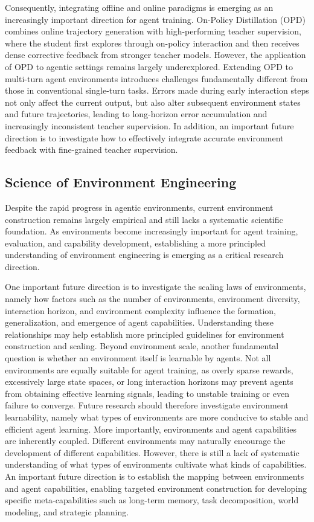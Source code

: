 \documentclass{llmxive}
\begin{document}
Consequently, integrating offline and online paradigms is emerging as an increasingly important direction for agent training.
On-Policy Distillation (OPD) \cite{OPD} combines online trajectory generation with high-performing teacher supervision, where the student first explores through on-policy interaction and then receives dense corrective feedback from stronger teacher models.
However, the application of OPD to agentic settings remains largely underexplored.
Extending OPD to multi-turn agent environments introduces challenges fundamentally different from those in conventional single-turn tasks.
Errors made during early interaction steps not only affect the current output, but also alter subsequent environment states and future trajectories, leading to long-horizon error accumulation and increasingly inconsistent teacher supervision.
In addition, an important future direction is to investigate how to effectively integrate accurate environment feedback with fine-grained teacher supervision.


\subsection{Science of Environment Engineering}

Despite the rapid progress in agentic environments, current environment construction remains largely empirical and still lacks a systematic scientific foundation.
As environments become increasingly important for agent training, evaluation, and capability development, establishing a more principled understanding of environment engineering is emerging as a critical research direction.

One important future direction is to investigate the scaling laws of environments, namely how factors such as the number of environments, environment diversity, interaction horizon, and environment complexity influence the formation, generalization, and emergence of agent capabilities.
Understanding these relationships may help establish more principled guidelines for environment construction and scaling.
Beyond environment scale, another fundamental question is whether an environment itself is learnable by agents.
Not all environments are equally suitable for agent training, as overly sparse rewards, excessively large state spaces, or long interaction horizons may prevent agents from obtaining effective learning signals, leading to unstable training or even failure to converge.
Future research should therefore investigate environment learnability, namely what types of environments are more conducive to stable and efficient agent learning.
More importantly, environments and agent capabilities are inherently coupled.
Different environments may naturally encourage the development of different capabilities.
However, there is still a lack of systematic understanding of what types of environments cultivate what kinds of capabilities.
An important future direction is to establish the mapping between environments and agent capabilities, enabling targeted environment construction for developing specific meta-capabilities such as long-term memory, task decomposition, world modeling, and strategic planning.
\end{document}
